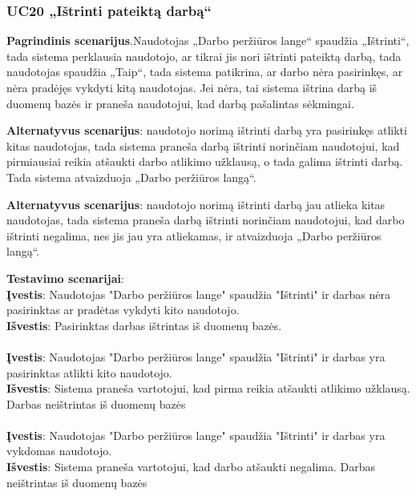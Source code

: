 \documentclass{VUMIFPSbakalaurinis}
\begin{document}
\subsubsection{UC20 „Ištrinti pateiktą darbą“}
\textbf{Pagrindinis scenarijus}.Naudotojas „Darbo peržiūros lange“ spaudžia „Ištrinti“, tada sistema perklausia naudotojo, ar tikrai jis nori ištrinti pateiktą darbą, tada naudotojas spaudžia „Taip“, tada sistema patikrina, ar darbo nėra pasirinkęs, ar nėra pradėjęs vykdyti kitą naudotojas. Jei nėra, tai sistema ištrina darbą iš duomenų bazės ir praneša naudotojui, kad darbą pašalintas sėkmingai.
\par \textbf{Alternatyvus scenarijus}: naudotojo norimą ištrinti darbą yra pasirinkęs atlikti kitas naudotojas, tada sistema praneša darbą ištrinti norinčiam naudotojui, kad pirmiausiai reikia atšaukti darbo atlikimo užklausą, o tada galima ištrinti darbą. Tada sistema atvaizduoja „Darbo peržiūros langą“.
\par \textbf{Alternatyvus scenarijus}: naudotojo norimą ištrinti darbą jau atlieka kitas naudotojas, tada sistema praneša darbą ištrinti norinčiam naudotojui, kad darbo ištrinti negalima, nes jis jau yra atliekamas, ir atvaizduoja „Darbo peržiūros langą“.
\par \textbf{Testavimo scenarijai}:\\
\textbf{Įvestis}: Naudotojas "Darbo peržiūros lange" spaudžia "Ištrinti" ir darbas nėra pasirinktas ar pradėtas vykdyti kito naudotojo. \\
\textbf{Išvestis}: Pasirinktas darbas ištrintas iš duomenų bazės. \\ \\
\textbf{Įvestis}: Naudotojas "Darbo peržiūros lange" spaudžia "Ištrinti" ir darbas yra pasirinktas atlikti kito naudotojo. \\
\textbf{Išvestis}: Sistema praneša vartotojui, kad pirma reikia atšaukti atlikimo užklausą. Darbas neištrintas iš duomenų bazės\\ \\
\textbf{Įvestis}: Naudotojas "Darbo peržiūros lange" spaudžia "Ištrinti" ir darbas yra vykdomas naudotojo. \\
\textbf{Išvestis}: Sistema praneša vartotojui, kad darbo atšaukti negalima. Darbas neištrintas iš duomenų bazės\\ \\
\end{document}
